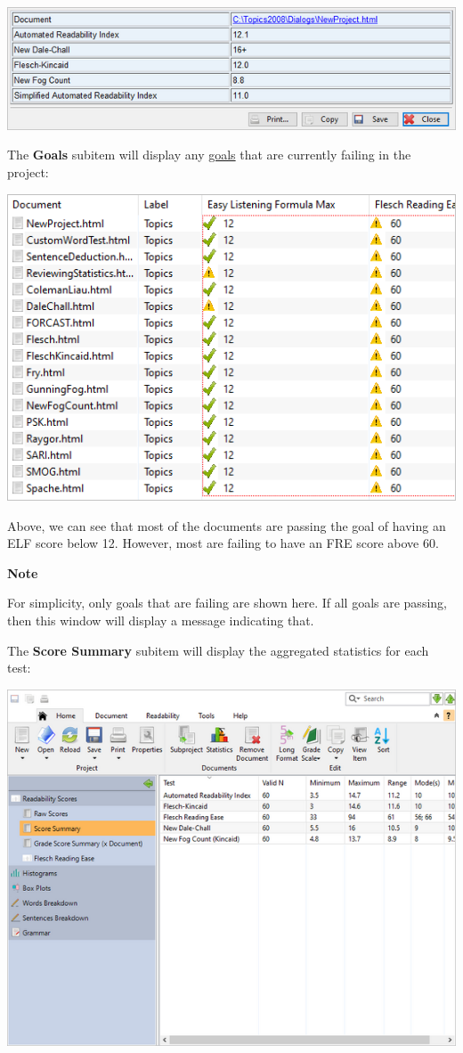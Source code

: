 \documentclass[
]{book}
\newenvironment{notesection}
    {
    \begin{tcolorbox}[colframe=mediumblue,colback=lightblue,coltext=mediumblue,arc=3mm]
    \faLightbulb[regular] \textbf{Note} \newline
    }
    {
    \end{tcolorbox}
    }
\theoremstyle{definition}
\theoremstyle{definition}
\theoremstyle{definition}
\theoremstyle{definition}
\theoremstyle{remark}
\begin{document}
\begin{center}\includegraphics[width=0.75\linewidth,]{Images/viewitemrawscores} \end{center}

The \textbf{Goals} subitem will display any \protect\hyperlink{reviewing-goals}{goals} that are currently failing in the project:

\begin{center}\includegraphics[width=0.75\linewidth,]{Images/BatchProjectGoals} \end{center}

Above, we can see that most of the documents are passing the goal of having an ELF score below 12. However, most are failing to have an FRE score above 60.

\begin{notesection}
For simplicity, only goals that are failing are shown here. If all goals are passing, then this window will display a message indicating that.

\end{notesection}

The \textbf{Score Summary} subitem will display the aggregated statistics for each test:

\includegraphics{Images/batchscorestats.png}
\end{document}
